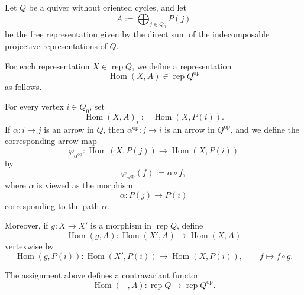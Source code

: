 \documentclass[11pt, a4paper]{report}
\begin{document}
        \begin{definition}
            Let \(Q\) be a quiver without oriented cycles, and let
            \[
            A:=\bigoplus_{j\in Q_0} P(j)
            \]
            be the free representation given by the direct sum of the indecomposable projective
            representations of \(Q\).

            For each representation \(X\in \operatorname{rep}Q\), we define a representation
            \[
            \operatorname{Hom}(X,A)\in \operatorname{rep}Q^{\operatorname{op}}
            \]
            as follows.

            For every vertex \(i\in Q_0\), set
            \[
            \operatorname{Hom}(X,A)_i:=\operatorname{Hom}(X,P(i)).
            \]
            If \(\alpha:i\to j\) is an arrow in \(Q\), then \(\alpha^{\operatorname{op}}:j\to i\) is an arrow
            in \(Q^{\operatorname{op}}\), and we define the corresponding arrow map
            \[
            \varphi_{\alpha^{\operatorname{op}}}:
            \operatorname{Hom}(X,P(j))\longrightarrow \operatorname{Hom}(X,P(i))
            \]
            by
            \[
            \varphi_{\alpha^{\operatorname{op}}}(f):=\alpha\circ f,
            \]
            where \(\alpha\) is viewed as the morphism
            \[
            \alpha:P(j)\longrightarrow P(i)
            \]
            corresponding to the path \(\alpha\).

            Moreover, if \(g:X\to X'\) is a morphism in \(\operatorname{rep}Q\), define
            \[
            \operatorname{Hom}(g,A):\operatorname{Hom}(X',A)\longrightarrow \operatorname{Hom}(X,A)
            \]
            vertexwise by
            \[
            \operatorname{Hom}(g,P(i)):
            \operatorname{Hom}(X',P(i))\longrightarrow \operatorname{Hom}(X,P(i)),
            \qquad
            f\longmapsto f\circ g.
            \]
            \end{definition}

            \begin{proposition}
            The assignment above defines a contravariant functor
            \[
            \operatorname{Hom}(-,A):\operatorname{rep}Q\longrightarrow \operatorname{rep}Q^{\operatorname{op}}.
            \]
            \end{proposition}
\end{document}
